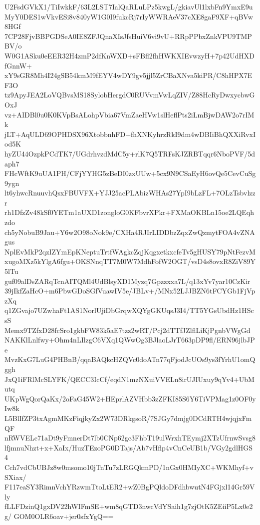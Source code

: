 U2FsdGVkX1/TiIwkkF/63L2LST7IalQaRLuLPz5kwgL/gkiavUl1lxbFn9YmxE9u
MyY0DES1wVkvESi8v840yW1G0I9fukcRj7rIyWWRAeV37cXE8gaF9XF+qBVw8HGf
7CP28FjvBBPGDSeA0IE8ZFJQnaXIsJfsHuiV6vi9vU+RRpPPbxZnkVPU9TMPBV/o
W0G1ASku0eEER32H4zmP2dfKnWXD+sFBfl2fhHWKXIEvwzyH+7p42UdHXDfGnnW+
xY9sGR8Mh4I24gSB54kmM9fEYV4wDY9gv5jjl5ZrCBaXNva5kiPR/C8hHPX7EF3O
tz9ApyJEA2LoVQBvsMS18SylobHergdC0RUVvmVwLqZIV/Z88HcRyDwxycbwGOxJ
vz+AIDBl0u0K0KVpBsALohpVbia67VmZaeHVw1slHeflPts2iLmBjwDAW2o7rIMk
jLT+AqULD69OPHDSX96XtobbnhFD+fhXNKyhrzRkI9dm4wDBIiBhQXXiRvxIod5K
hyZU44OzpkPCdTK7/UGdrhvzdMdC5y+rlK7Q5TRFsKJZRBTqqr6NboPVF/5daph7
FHcWftK9uUA1PH/CFjYYHG5zBeDI0zxUUw+5cx9N9CSaEyH6ovQe5CevCuSg9ygn
lt6yhwcRnuuvhQsxFBUVFX+YJJ25acPLAbizWHAs27YpI9bLzFL+7OLzTsbvlzzr
rh1DfzZv48kSf0YETm1aUXD1zongloG0KFbvrXPkr+FXMaOKBLn15oe2LQEqhzdo
ch5yNobuB9Jau+Y6w2O98oNok9e/CXHa4RJIrLIDDbzZqxZwQzmytFOA4vZNAgus
NplEvMkP2qzIZYmEpKNeptuTrtfWAgkcZqjKqgxetkxcfeTv5gHUSY79pNtFezvM
xugoMXz5kYlgA6fgu+OKSNnqTT7M0W7MdhFofW2OGT/vsD4s8ovxR8ZiV89Y5lTu
guf09alDsZARqTcnAITQMl4UdBlsyXD1Myzq7Gpzzxxa7L/q13xYv7yar10CzKir
39jIkfZaHcO+m6PbwGDoSGfVuawIV5e/JBLv+/MNx52LJJBZN6tFCYGb1FjVpzXq
q1ZGvajo7UZwhaFt1AS1NorlUjiDbGrqwXQYgGKUqsJ3I4/TT5YGsUbdHz1HScsS
Memx9TZfxD28fcSro1gkbFW83k5aE7tzz2wRT/Pcj2dTTfJZlflLiKjPgnbVWgGd
NAKKlLnlfwy+Ohm4nLIlzgC6VXq1QWwOg3BJlaoLJrT663pDP9fl/ERN96jlbJPe
MvzKxG7LuG4PHBnB/qqaBAQkcHZQVc0doATn77qFjodJcUOs9ys3fYrhU1omQggh
JxQ1iFRlMcSLYFK/QECC3IcCf/eqdN1mzNXuiVVELn8irUJIUxuy9qYv4+UbMutq
UKpWgQorQaKx/2oFaG45W2+HEprlAZVHbb3zZFKI85S6Y6TiVPMag1z0OF0yIw8k
L5BlIfZP3txAgmMKzFiqjkyZx2W73DRkgsoR/7SJGy7dmjg0DCdRTH4wjqjxFmQF
nRWVELc71aDt9yFmnerDt7lb0CNp62gc3FhbT19ulWrxhTEymj2XTzUfrnwSvsg8
lfjmnuNhzt+x+XaIx/HuzTEzoPG0DTajs/Ab7vHflp4vCnCeUB1b/VGy2gdlHGS4
Cch7vdCbUBJz8w0msomo10jTnTu7zLRGQkmPD/1nGx0HMIyXC+WKMhyf+vSXiax/
F117eaSY3RimnVchYRzwmTtoLtER2+wZ0BgPQldoDFdhbwutN4FGjxl14Gr59Vly
fLLFDzinQ1gxDV22hWIFmSE+wm8qGTD3nwcVdYSaih1g7zjOtK5ZEiiP5Lx0e2g/
GOM0OLR6oav+jer0sfxYgQ==
